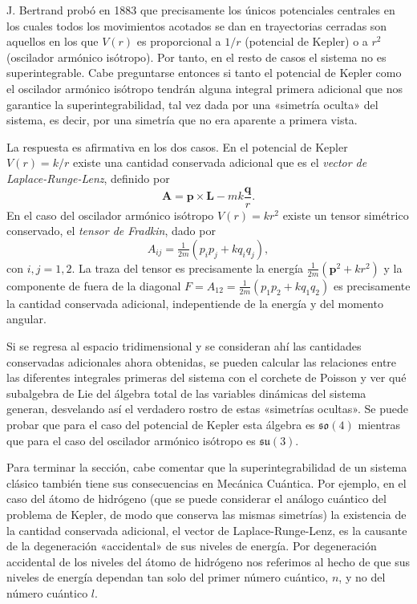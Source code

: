 \documentclass[12pt,a4paper,twoside]{article}
\theoremstyle{definition} \newtheorem{defn}[thm]{Definición}
\theoremstyle{definition} \newtheorem{ejemplo}[thm]{Ejemplo}
\theoremstyle{definition} \newtheorem{ejercicio}[thm]{Ejercicio}
\theoremstyle{remark} \newtheorem*{obs}{Observación}
\newcommand{\vect}[1]{\mathbf{#1}}
\begin{document}
J. Bertrand probó en 1883 \cite{bertrand} que precisamente los únicos potenciales centrales en los cuales todos los movimientos acotados se dan en trayectorias cerradas son aquellos en los que $V(r)$ es proporcional a $1/r$ (potencial de Kepler) o a $r^2$ (oscilador armónico isótropo). Por tanto, en el resto de casos el sistema no es superintegrable. Cabe preguntarse entonces si tanto el potencial de Kepler como el oscilador armónico isótropo tendrán alguna integral primera adicional que nos garantice la superintegrabilidad, tal vez dada por una «simetría oculta» del sistema, es decir, por una simetría que no era aparente a primera vista.

La respuesta es afirmativa en los dos casos. En el potencial de Kepler $V(r)=k/r$ existe una cantidad conservada adicional que es el \emph{vector de Laplace-Runge-Lenz}, definido por
\begin{equation}
  \vect{A}=\vect{p}\times \vect{L}-mk\frac{\vect{q}}{r}. 
\end{equation}
En el caso del oscilador armónico isótropo $V(r)=kr^2$ existe un tensor simétrico conservado, el \emph{tensor de Fradkin}, dado por
\begin{equation}
  A_{ij}=\tfrac{1}{2m}(p_ip_j+kq_iq_j), 
\end{equation}
con $i,j=1,2$. La traza del tensor es precisamente la energía $\tfrac{1}{2m}(\vect{p}^2+kr^2)$ y la componente de fuera de la diagonal $F=A_{12}=\tfrac{1}{2m}(p_1p_2+kq_1q_2)$ es precisamente la cantidad conservada adicional, indepentiende de la energía y del momento angular. 

Si se regresa al espacio tridimensional y se consideran ahí las cantidades conservadas adicionales ahora obtenidas, se pueden calcular las relaciones entre las diferentes integrales primeras del sistema con el corchete de Poisson y ver qué subalgebra de Lie del álgebra total de las variables dinámicas del sistema generan, desvelando así el verdadero rostro de estas «simetrías ocultas». Se puede probar que para el caso del potencial de Kepler esta álgebra es $\mathfrak{so}(4)$ mientras que para el caso del oscilador armónico isótropo es $\mathfrak{su}(3)$.

Para terminar la sección, cabe comentar que la superintegrabilidad de un sistema clásico también tiene sus consecuencias en Mecánica Cuántica. Por ejemplo, en el caso del átomo de hidrógeno (que se puede considerar el análogo cuántico del problema de Kepler, de modo que conserva las mismas simetrías) la existencia de la cantidad conservada adicional, el vector de Laplace-Runge-Lenz, es la causante de la degeneración «accidental» de sus niveles de energía. Por degeneración accidental de los niveles del átomo de hidrógeno nos referimos al hecho de que sus niveles de energía dependan tan solo del primer número cuántico, $n$, y no del número cuántico $l$.
\end{document}
